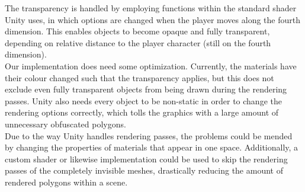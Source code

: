 The transparency is handled by employing functions within the standard shader Unity uses, in which options are changed when the player moves along the fourth dimension. This enables objects to become opaque and fully transparent, depending on relative distance to the player character (still on the fourth dimension).\\

Our implementation does need some optimization. Currently, the materials have their colour changed such that the transparency applies, but this does not exclude even fully transparent objects from being drawn during the rendering passes. Unity also needs every object to be non-static in order to change the rendering options correctly, which tolls the graphics with a large amount of unnecessary obfuscated polygons.\\

Due to the way Unity handles rendering passes, the problems could be mended by changing the properties of materials that appear in one space. Additionally, a custom shader or likewise implementation could be used to skip the rendering passes of the completely invisible meshes, drastically reducing the amount of rendered polygons within a scene.\\